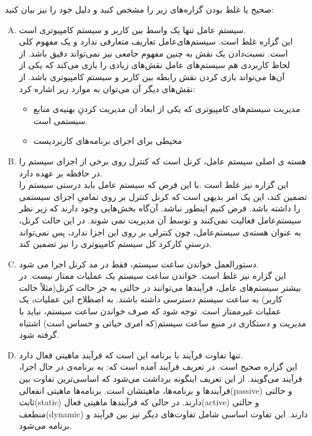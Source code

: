 \documentclass[]{article}
\begin{document}
صحیح یا غلط بودن  گزاره‌های زیر را مشخص کنید و دلیل خود را نیز بیان کنید:
\vspace{0.2cm}
\begin{enumerate}[(A)]
    \item سیستم عامل تنها یک واسط بین کاربر و سیستم کامپیوتری است. \\
    این گزاره غلط است. سیستم‌های‌عامل تعاریف متعارفی ندارد و یک مفهوم کلی است. نسبت‌دادن یک نقش به چنین مفهوم جامعی نیز نمی‌تواند دقیق باشد. از لحاظ کاربردی هم سیستم‌های عامل نقش‌های زیادی را بازی می‌کند که یکی از آن‌ها می‌تواند بازی کردن نقش رابطه بین کاربر و سیستم کامپیوتری باشد.
    از نقش‌های دیگر آن می‌توان به موارد زیر اشاره کرد:
    \vspace{-0.15cm}
    \begin{itemize}
        \item مدیریت سیستم‌های کامپیوتری که یکی از ابعاد آن مدیریت‌ کردنِ بهنیه‌ی منابع سیستمی است.
        \item محیطی برای اجرای برنامه‌های کاربردیست
    \end{itemize}

    \item هسته ی اصلی سیستم عامل، کرنل است که کنترل روی برخی از اجزای سیستم را در حافظه بر عهده دارد. \\
    این گزاره نیز غلط است .با این فرض که سیستم عامل باید درستی سیستم را تضمین کند، این یک امر بدیهی است که  کرنل کنترل بر روی تمامیِ اجزای سیستمی را داشته باشد. فرض کنیم اینطور نباشد.
    آن‌گاه بخش‌هایی وجود دارند که زیر نظر سیستم‌عامل فعالیت نمی‌کنند و توسط آن مدیریت نمی شوند.
    در این حالت کرنل، به عنوان هسته‌ی سیستم‌عامل، چون کنترلی بر روی این اجزا ندارد، پس نمی‌تواند درستیِ کارکرد کل سیستم‌ کامپیوتری را نیز تضمین کند.

    \item دستورالعمل خواندن ساعت سیستم، فقط در مد کرنل اجرا می شود. \\
    این گزاره نیز غلط است. خواندن ساعت سیستم یک عملیات ممتاز نیست. در بیشتر سیستم‌های عامل، فرآیندها می‌توانند در حالتی به جز حالت کرنل(مثلاً حالت کاربر) به ساعت سیستم دسترسی داشته باشند.
    به اصطلاح این عملیات، یک عملیات غیرممتاز است. توجه شود که صرف خواندن ساعت سیستم، نباید با مدیریت و دستکاری در منبع ساعت سیستم(که امری حیاتی و حساس است) اشتباه گرفته شود.

    \item تنها تفاوت فرآیند با برنامه این است که فرآیند ماهیتی فعال دارد. \\
    این گزاره صحیح است. در تعریف فرآیند آمده است که: به برنامه‌ی در حال اجرا، فرآیند می‌گویند.
    از این تعریف اینگونه برداشت می‌شود که اساسی‌ترین تفاوت بین فرآیند‌ها و برنامه‌ها، ماهیتشان است. 
    برنامه‌ها ماهیتی انفعالی(passive) و حالتی ثابت(static) دارند. در حالی که فرآیند‌ها ماهیتی فعال(active) و حالتی منطعف(dynamic) دارند.
    این تفاوت اساسی شامل تفاوت‌های دیگر نیز بین فرآیند و برنامه می‌شود.
\end{enumerate}
\end{document}
